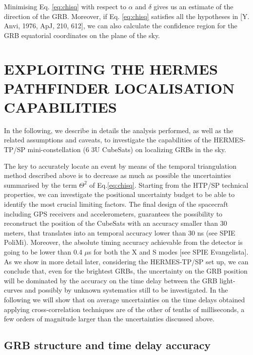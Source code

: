 \documentclass[]{spie}  %
\begin{document}
Minimising Eq. \ref{eq:chisq} with respect to $\alpha$ and $\delta$ gives us an estimate of the direction of the GRB.
Moreover, if Eq. \ref{eq:chisq} satisfies all the hypotheses in [Y.  Anvi, 1976, ApJ, 210, 612], we can also calculate the confidence region for the GRB equatorial coordinates on the plane of the sky.






\section{EXPLOITING THE HERMES PATHFINDER LOCALISATION CAPABILITIES }

In the following, we describe in details the analysis performed, as well as the related assumptions and caveats, to investigate the capabilities of the HERMES-TP/SP mini-constellation (6 3U CubeSats) on localizing GRBs in the sky.

The key to accurately locate an event by means of the temporal triangulation method described above is to decrease as much as possible the uncertainties summarised by the term $\Theta^2$ of Eq.\ref{eq:chisq}. Starting from the HTP/SP technical properties, we can investigate the positional uncertainty budget to be able to identify the most crucial limiting factors. The final design of the spacecraft including GPS receivers and accelerometers, guarantees the possibility to reconstruct the position of the CubeSats with an accuracy smaller than 30 meters, that translates into an temporal accuracy lower than 30 ns (see SPIE PoliMi). Moreover, the absolute timing accuracy achievable from the detector is going to be lower than 0.4 $\mu$s for both the X and S modes [see SPIE Evangelista]. As we show in more detail later, considering the HERMES-TP/SP set up, we can conclude that, even for the brightest GRBs, the uncertainty on the GRB position will be dominated by the accuracy on the time delay between the GRB light-curves and possibly by unknown systematics still to be investigated. In the following we will show that on average uncertainties on the time delays obtained applying cross-correlation techniques are of the other of tenths of milliseconds, a few orders of magnitude larger than the uncertainties discussed above.

\subsection{GRB structure and time delay accuracy}
\end{document}
